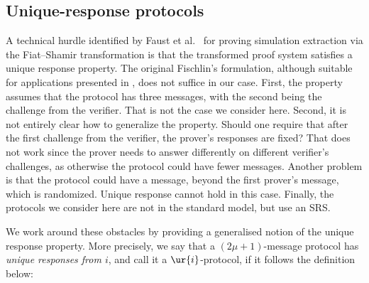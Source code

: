 
\subsection{Unique-response protocols}
A technical hurdle identified by Faust et al.~\cite{INDOCRYPT:FKMV12} for proving
simulation extraction via the Fiat--Shamir transformation is that the transformed
proof system satisfies a unique response property. The original Fischlin's
formulation, although suitable for applications presented in
\cite{C:Fischlin05,INDOCRYPT:FKMV12}, does not suffice in our case. First, the
property assumes that the protocol has three messages, with the second being the
challenge from the verifier. That is not the case we consider here. Second, it is not
entirely clear how to generalize the property. Should one require that after the
first challenge from the verifier, the prover's responses are fixed?  That does not
work since the prover needs to answer differently on different verifier's challenges,
as otherwise the protocol could have fewer messages.  Another problem is that the
protocol could have a message, beyond the first prover's message, which is
randomized. Unique response cannot hold in this case. Finally, the protocols we
consider here are not in the standard model, but use an SRS.

We work around these obstacles by providing a generalised notion of the unique
response property. More precisely, we say that a $(2\mu + 1)$-message protocol
has \emph{unique responses from $i$}, and call it a $\ur{i}$-protocol, if it
follows the definition below:


